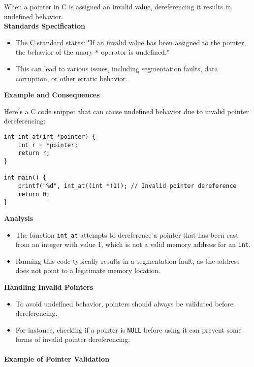 \documentclass[12pt]{article}
\begin{document}
When a pointer in C is assigned an invalid value, dereferencing it results in undefined behavior.\\

\textbf{Standards Specification}
\begin{itemize}
    \item The C standard states: "If an invalid value has been assigned to the pointer, the behavior of the unary \texttt{*} operator is undefined."
    \item This can lead to various issues, including segmentation faults, data corruption, or other erratic behavior.
\end{itemize}

\textbf{Example and Consequences}

Here's a C code snippet that can cause undefined behavior due to invalid pointer dereferencing:

\begin{verbatim}
int int_at(int *pointer) {
    int r = *pointer;
    return r;
}

int main() {
    printf("%d", int_at((int *)1)); // Invalid pointer dereference
    return 0;
}
\end{verbatim}

\textbf{Analysis}
\begin{itemize}
    \item The function \texttt{int\_at} attempts to dereference a pointer that has been cast from an integer with value 1, which is not a valid memory address for an \texttt{int}.
    \item Running this code typically results in a segmentation fault, as the address does not point to a legitimate memory location.
\end{itemize}

\textbf{Handling Invalid Pointers}

\begin{itemize}
    \item To avoid undefined behavior, pointers should always be validated before dereferencing.
    \item For instance, checking if a pointer is \texttt{NULL} before using it can prevent some forms of invalid pointer dereferencing.
\end{itemize}

\paragraph{Example of Pointer Validation}
\end{document}
